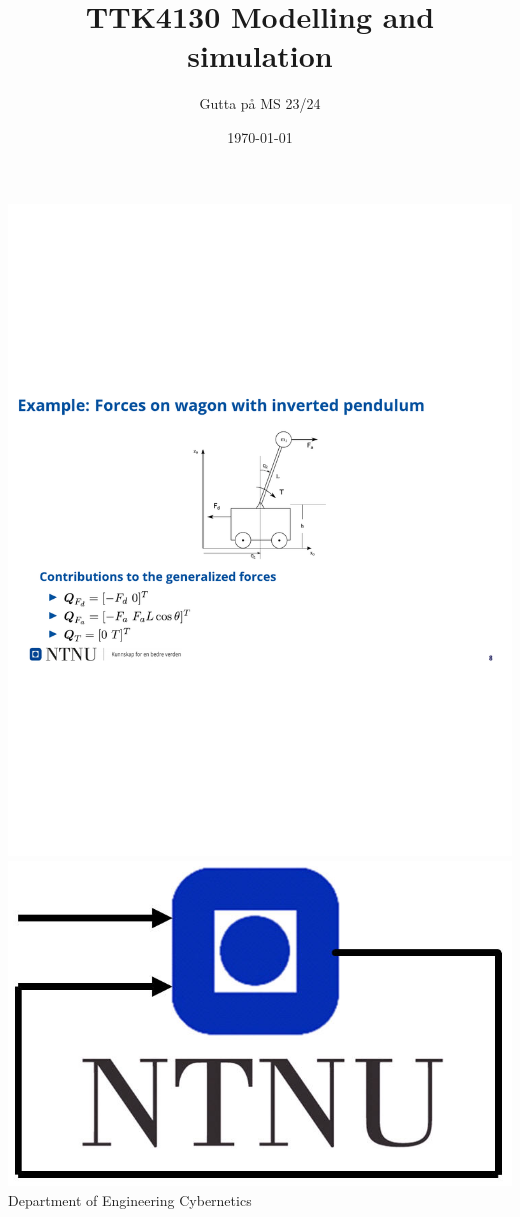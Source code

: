 \documentclass[11pt, a4paper, USenglish]{article} %
\begin{document}
\title{TTK4130 Modelling and simulation}
\author{Gutta på MS 23/24}
\date{\today}
\begin{titlepage}
    \maketitle
    \begin{center}
    \includegraphics[scale=1, trim={7cm 12.5cm 7cm 9.4cm}, clip]{figures/wagon.pdf}
    \vfill %
    \includegraphics[scale=0.4]{figures/itk_ntnu}\\
    Department of Engineering Cybernetics
    \end{center}
    \thispagestyle{empty}
\end{titlepage}
\end{document}
